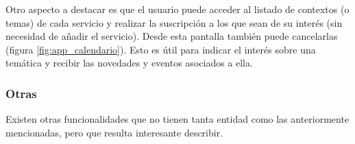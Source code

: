 Otro aspecto a destacar es que el usuario puede acceder al listado de contextos (o temas) de cada servicio y realizar la suscripción a los que sean de su interés (sin necesidad de añadir el servicio). Desde esta pantalla también puede cancelarlas (figura \ref{fig:app_calendario}). Esto es útil para indicar el interés sobre una temática y recibir las novedades y eventos asociados a ella.



\subsubsection{Otras}
\label{funcionalidad_otras}

Existen otras funcionalidades que no tienen tanta entidad como las anteriormente mencionadas, pero que resulta interesante describir.

